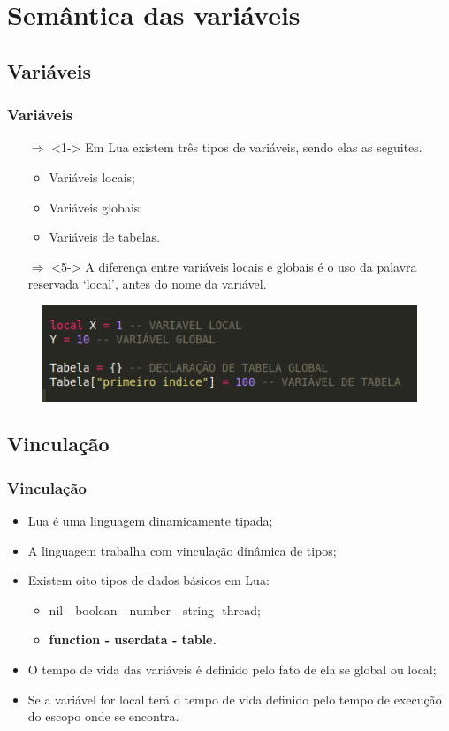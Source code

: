 ﻿\documentclass{beamer}
\begin{document}
\section{Semântica das variáveis}
\subsection{Variáveis}
\begin{frame}[fragile]
\frametitle{Variáveis}
\begin{itemize}
\item [$\Rightarrow$]<1-> Em Lua existem três tipos de variáveis, sendo elas as seguites.
\begin{itemize}
\item <2-> Variáveis locais;
\item <3-> Variáveis globais;
\item <4-> Variáveis de tabelas.
\end{itemize}
\item [$\Rightarrow$]<5-> A diferença entre variáveis locais e globais é o uso da palavra reservada ‘local’, antes do nome da variável.
\end{itemize}
\begin{figure}[!htb]
\centering
\includegraphics[width=0.7\linewidth]{imagens/variaveis}
\end{figure}
\end{frame}

\subsection{Vinculação}
\begin{frame}[fragile]
\frametitle{Vinculação}
\begin{itemize}
\item<1-> Lua é uma linguagem dinamicamente tipada;
\item<2-> A linguagem trabalha com vinculação dinâmica de tipos;
\item<3-> Existem oito tipos de dados básicos em Lua:
\begin{itemize}
\item<4-> nil - boolean - number - string- thread;
\item<5-> \textbf{function - userdata - table.}
\end{itemize}
\item<6-> O tempo de vida das variáveis é definido pelo fato de ela se global ou local;
\item<7-> Se a variável for local terá o tempo de vida definido pelo tempo de execução do escopo onde se encontra.
\end{itemize}
\end{frame}
\end{document}
